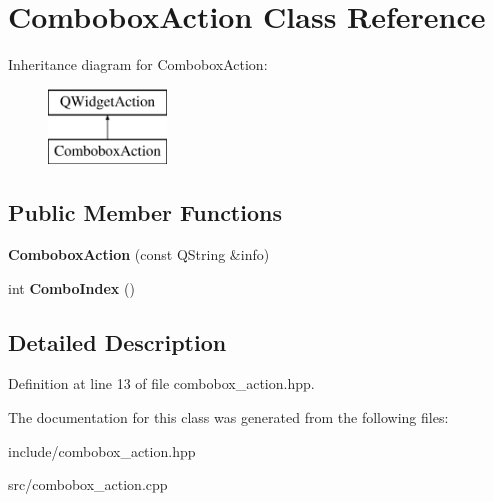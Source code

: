 \hypertarget{classComboboxAction}{}\section{Combobox\+Action Class Reference}
\label{classComboboxAction}
Inheritance diagram for Combobox\+Action\+:\begin{figure}[H]
\begin{center}
\leavevmode
\includegraphics[height=2.000000cm]{classComboboxAction}
\end{center}
\end{figure}
\subsection*{Public Member Functions}
\begin{DoxyCompactItemize}
\item 
\mbox{\label{classComboboxAction_afa2a6bfade094a82beef7d478c5a4cf8}} 
{\bfseries Combobox\+Action} (const Q\+String \&info)
\item 
\mbox{\label{classComboboxAction_adfe475154e5b88eddbc9a51759bdf312}} 
int {\bfseries Combo\+Index} ()
\end{DoxyCompactItemize}


\subsection{Detailed Description}


Definition at line 13 of file combobox\+\_\+action.\+hpp.



The documentation for this class was generated from the following files\+:\begin{DoxyCompactItemize}
\item 
include/combobox\+\_\+action.\+hpp\item 
src/combobox\+\_\+action.\+cpp\end{DoxyCompactItemize}
